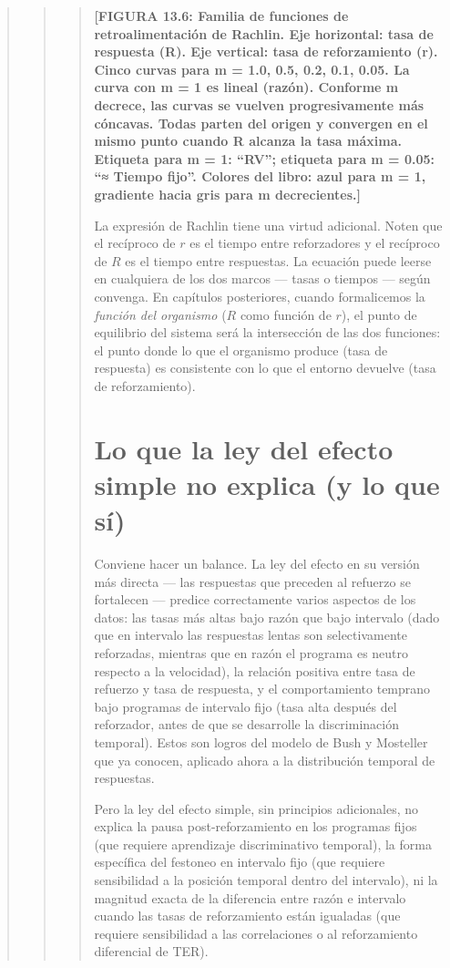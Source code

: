 \documentclass[
  letterpaper,
  DIV=11,
  numbers=noendperiod]{scrreprt}
\begin{document}
\begin{tcolorbox}[enhanced jigsaw, toprule=.15mm, arc=.35mm, colback=white, opacityback=0, colframe=quarto-callout-note-color-frame, breakable, rightrule=.15mm, left=2mm, leftrule=.75mm, bottomrule=.15mm]
\begin{quote}
\begin{quote}
\begin{quote}
\textbf{{[}FIGURA 13.6: Familia de funciones de retroalimentación de
Rachlin. Eje horizontal: tasa de respuesta (R). Eje vertical: tasa de
reforzamiento (r). Cinco curvas para m = 1.0, 0.5, 0.2, 0.1, 0.05. La
curva con m = 1 es lineal (razón). Conforme m decrece, las curvas se
vuelven progresivamente más cóncavas. Todas parten del origen y
convergen en el mismo punto cuando R alcanza la tasa máxima. Etiqueta
para m = 1: ``RV''; etiqueta para m = 0.05: ``≈ Tiempo fijo''. Colores
del libro: azul para m = 1, gradiente hacia gris para m
decrecientes.{]}}

La expresión de Rachlin tiene una virtud adicional. Noten que el
recíproco de \(r\) es el tiempo entre reforzadores y el recíproco de
\(R\) es el tiempo entre respuestas. La ecuación puede leerse en
cualquiera de los dos marcos --- tasas o tiempos --- según convenga. En
capítulos posteriores, cuando formalicemos la \emph{función del
organismo} (\(R\) como función de \(r\)), el punto de equilibrio del
sistema será la intersección de las dos funciones: el punto donde lo que
el organismo produce (tasa de respuesta) es consistente con lo que el
entorno devuelve (tasa de reforzamiento).

\section{Lo que la ley del efecto simple no explica (y lo que
sí)}\label{lo-que-la-ley-del-efecto-simple-no-explica-y-lo-que-suxed}

Conviene hacer un balance. La ley del efecto en su versión más directa
--- las respuestas que preceden al refuerzo se fortalecen --- predice
correctamente varios aspectos de los datos: las tasas más altas bajo
razón que bajo intervalo (dado que en intervalo las respuestas lentas
son selectivamente reforzadas, mientras que en razón el programa es
neutro respecto a la velocidad), la relación positiva entre tasa de
refuerzo y tasa de respuesta, y el comportamiento temprano bajo
programas de intervalo fijo (tasa alta después del reforzador, antes de
que se desarrolle la discriminación temporal). Estos son logros del
modelo de Bush y Mosteller que ya conocen, aplicado ahora a la
distribución temporal de respuestas.

Pero la ley del efecto simple, sin principios adicionales, no explica la
pausa post-reforzamiento en los programas fijos (que requiere
aprendizaje discriminativo temporal), la forma específica del festoneo
en intervalo fijo (que requiere sensibilidad a la posición temporal
dentro del intervalo), ni la magnitud exacta de la diferencia entre
razón e intervalo cuando las tasas de reforzamiento están igualadas (que
requiere sensibilidad a las correlaciones o al reforzamiento diferencial
de TER).


\end{quote}
\end{quote}
\end{quote}
\end{tcolorbox}
\end{document}
